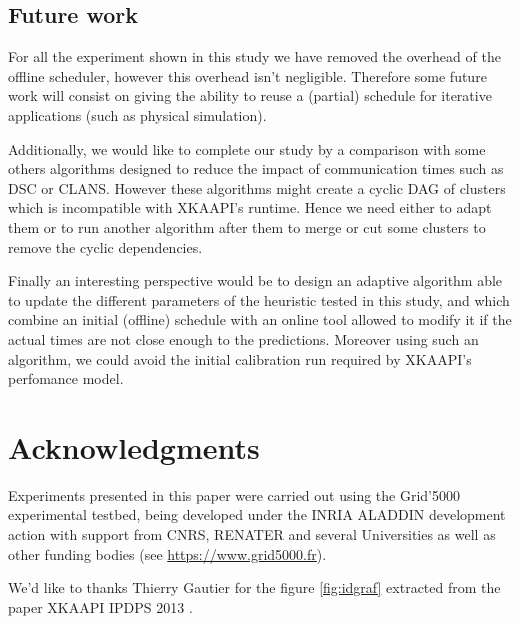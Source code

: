 \documentclass[10pt, conference, compsocconf,pdftex,dvipsnames]{IEEEtran}
\newcommand{\mytodo}[1]{\todo[inline]{#1}}
\begin{document}
\subsection{Future work }
\label{chap:cncl-work}

For all the experiment shown in this study we have removed the overhead of the
offline scheduler, however this overhead isn't negligible. Therefore some future
work will consist on giving the ability to reuse a (partial) schedule for
iterative applications (such as physical simulation).

Additionally, we would like to complete our study by a comparison with some
others algorithms designed to reduce the impact of communication times such as
DSC or CLANS. However these algorithms might create a cyclic DAG of clusters
which is incompatible with XKAAPI's runtime. Hence we need either to adapt
them or to run another algorithm after them to merge or cut some clusters to
remove the cyclic dependencies.

Finally an interesting perspective would be to design an adaptive algorithm
able to update the different parameters of the heuristic tested in this study,
and which combine an initial (offline) schedule with an online tool allowed to
modify it if the actual times are not close enough to the predictions. Moreover
using such an algorithm, we could avoid the initial calibration run required
by XKAAPI's perfomance model.

\section*{Acknowledgments}

Experiments presented in this paper were carried out using the Grid'5000
experimental testbed, being developed under the INRIA ALADDIN development 
action with support from CNRS, RENATER and several Universities as well as
other funding bodies (see \url{https://www.grid5000.fr}).


We'd like to thanks Thierry Gautier for the figure \ref{fig:idgraf} extracted
from the paper XKAAPI IPDPS 2013 \cite{gautierxkaapi}.






\mytodo{Remove the todo list}
\listoftodos



\end{document}
